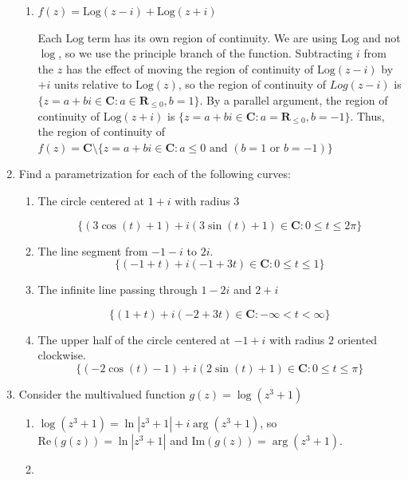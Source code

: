 \documentclass{article}
\makeatletter
\newcommand{\R}{\mathbf{R}}
\newcommand{\C}{\mathbf{C}}
\newcommand{\Log}{\text{Log}}
\newcommand{\Real}{\text{Re}}
\newcommand{\Imag}{\text{Im}}
\newcommand{\skipitems}[1]{%
	\addtocounter{\@enumctr}{#1}%
}
\makeatother
\begin{document}
\begin{enumerate}
\begin{enumerate}
		 \item $f(z)=\Log(z-i)+\Log(z+i)$
		 
		 Each $\Log$ term has its own region of continuity. We are using $\Log$ and not $\log$, so we use the principle branch of the function. Subtracting $i$ from the $z$ has the effect of moving the region of continuity of $\Log(z-i)$ by $+i$ units relative to $\Log(z)$, so the region of continuity of $Log(z-i)$ is $\{z = a+bi \in\C : a\in\R_{\leqslant 0}, b=1 \}$. By a parallel argument, the region of continuity of $\Log(z+i)$ is $\{z=a+bi\in\C : a=\R_{\leqslant 0}, b=-1 \}$. Thus, the region of continuity of $f(z) = \C\setminus\{z=a+bi\in\C : a \leqslant 0 \text{ and } (b = 1 \text{ or } b=-1)\}$
		\end{enumerate}

	\item Find a parametrization for each of the following curves:
		\begin{enumerate}
			\item The circle centered at $1+i$ with radius 3
			
			\[\{ (3\cos(t)+1)+i(3\sin(t)+1)\in\C : 0 \leqslant t \leq 2\pi \}\]
			
			\item The line segment from $-1-i$ to $2i$.
			\[\{ (-1+t)+i(-1+3t)\in\C : 0\leqslant t \leqslant 1 \}\]
			
			\item The infinite line passing through $1-2i$ and $2+i$
			
			\[\{ (1+t)+i(-2+3t)\in\C : -\infty < t < \infty \}\]
			
			\item The upper half of the circle centered at $-1+i$ with radius $2$ oriented clockwise.
			\[\{ (-2\cos(t)-1)+i(2\sin(t)+1)\in\C : 0 \leqslant t \leqslant \pi \}\]
		\end{enumerate}
		
	\skipitems{1}
		
	\item Consider the multivalued function $g(z)=\log(z^3+1)$	 
		\begin{enumerate}
			\item $\log(z^3+1)=\ln|z^3+1|+i\arg(z^3+1)$, so $\Real(g(z))=\ln|z^3+1|$ and $\Imag(g(z))=\arg(z^3+1)$.
			
			\item {}
			

\end{enumerate}
\end{enumerate}
\end{document}
